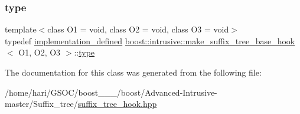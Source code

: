 \subsubsection{\texorpdfstring{type}{type}}
{\footnotesize\ttfamily template$<$class O1 = void, class O2 = void, class O3 = void$>$ \\
typedef \hyperlink{classboost_1_1intrusive_1_1make__suffix__tree__base__hook_a21cb881040ae75027aaa684f98669d45}{implementation\+\_\+defined} \hyperlink{classboost_1_1intrusive_1_1make__suffix__tree__base__hook}{boost\+::intrusive\+::make\+\_\+suffix\+\_\+tree\+\_\+base\+\_\+hook}$<$ O1, O2, O3 $>$\+::\hyperlink{classboost_1_1intrusive_1_1make__suffix__tree__base__hook_a72474fe783f53cf3da5ff706894eefd6}{type}}



The documentation for this class was generated from the following file\+:\begin{DoxyCompactItemize}
\item 
/home/hari/\+G\+S\+O\+C/boost\+\_\+\_\+\_/boost/\+Advanced-\/\+Intrusive-\/master/\+Suffix\+\_\+tree/\hyperlink{suffix__tree__hook_8hpp}{suffix\+\_\+tree\+\_\+hook.\+hpp}\end{DoxyCompactItemize}
